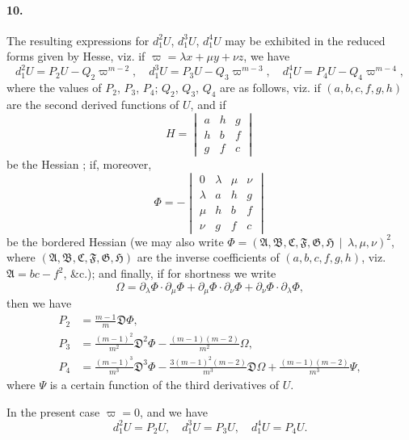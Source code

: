 \documentclass[12pt,a4paper]{article}
\theoremstyle{plain}
\begin{document}
\paragraph{10.}
The  resulting  expressions   for  $d_1^2 U$,  $d_1^3 U$,  $d_1^4 U$  may  be  exhibited  in  the  reduced
forms  given  by  Hesse,  viz.  if  $\varpi = \lambda x + \mu y + \nu z$,  we  have
\[
d_1^2 U = P_2 U - Q_2 \varpi^{m-2}, \quad d_1^3 U = P_3 U - Q_3 \varpi^{m-3}, \quad d_1^4 U = P_4 U - Q_4 \varpi^{m-4},
\]
where   the   values   of  $P_2$,  $P_3$,  $P_4$;   $Q_2$,  $Q_3$,  $Q_4$   are   as  follows,   viz.   if  $(a, b, c, f, g, h)$  are
the  second  derived  functions  of  $U$,  and  if
\[
H = \begin{vmatrix} a & h & g \\ h & b & f \\ g & f & c \end{vmatrix}
\]
be  the  Hessian ;   if,  moreover,
\[
\Phi = -\begin{vmatrix} 0 & \lambda & \mu & \nu \\ \lambda & a & h & g \\ \mu & h & b & f \\ \nu & g & f & c \end{vmatrix}
\]
be  the  bordered  Hessian  (we  may  also  write  $\Phi = (\mathfrak{A}, \mathfrak{B}, \mathfrak{C}, \mathfrak{F}, \mathfrak{G}, \mathfrak{H} \,\!\!\mid\, \lambda, \mu, \nu)^2$,  where
$(\mathfrak{A}, \mathfrak{B}, \mathfrak{C}, \mathfrak{F}, \mathfrak{G}, \mathfrak{H})$  are  the  inverse  coefficients  of  $(a, b, c, f, g, h)$,  viz.  $\mathfrak{A} = bc - f^2$,  \&c.);  
and  finally,  if  for  shortness  we  write
\[
\Omega = \partial_\lambda \Phi \cdot \partial_\mu \Phi + \partial_\mu \Phi \cdot \partial_\nu \Phi + \partial_\nu \Phi \cdot \partial_\lambda \Phi,
\]
then  we  have
\begin{align*}
P_2 &= \frac{m-1}{m} \mathfrak{D} \Phi, \\
P_3 &= \frac{(m-1)^2}{m^2} \mathfrak{D}^2 \Phi - \frac{(m-1)(m-2)}{m^2} \Omega, \\
P_4 &= \frac{(m-1)^3}{m^3} \mathfrak{D}^3 \Phi - \frac{3(m-1)^2(m-2)}{m^3} \mathfrak{D} \Omega + \frac{(m-1)(m-2)}{m^3} \Psi,
\end{align*}
where  $\Psi$  is  a  certain  function  of  the  third  derivatives  of  $U$.

\newpage

In  the  present  case  $\varpi = 0$,  and  we  have
\[
d_1^2 U = P_2 U, \quad d_1^3 U = P_3 U, \quad d_1^4 U = P_4 U.
\]
\end{document}
